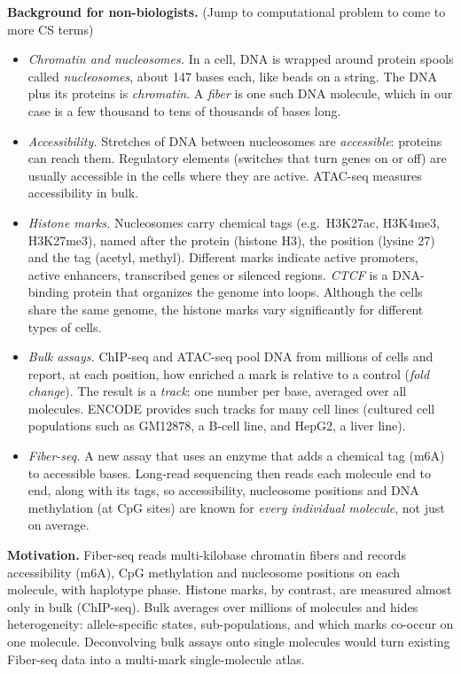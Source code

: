 \documentclass[acmtog]{acmart}
\begin{document}
\textbf{Background for non-biologists.} (Jump to computational problem to come to more CS terms)
\begin{itemize}
  \item \emph{Chromatin and nucleosomes.} In a cell, DNA is wrapped around protein spools called \emph{nucleosomes}, about 147 bases each, like beads on a string. The DNA plus its proteins is \emph{chromatin}. A \emph{fiber} is one such DNA molecule, which in our case is a few thousand to tens of thousands of bases long.
  \item \emph{Accessibility.} Stretches of DNA between nucleosomes are \emph{accessible}: proteins can reach them. Regulatory elements (switches that turn genes on or off) are usually accessible in the cells where they are active. ATAC-seq measures accessibility in bulk.
  \item \emph{Histone marks.} Nucleosomes carry chemical tags (e.g.\ H3K27ac, H3K4me3, H3K27me3), named after the protein (histone H3), the position (lysine 27) and the tag (acetyl, methyl). Different marks indicate active promoters, active enhancers, transcribed genes or silenced regions. \emph{CTCF} is a DNA-binding protein that organizes the genome into loops. Although the cells share the same genome, the histone marks vary significantly for different types of cells.
  \item \emph{Bulk assays.} ChIP-seq and ATAC-seq pool DNA from millions of cells and report, at each position, how enriched a mark is relative to a control (\emph{fold change}). The result is a \emph{track}: one number per base, averaged over all molecules. ENCODE provides such tracks for many cell lines (cultured cell populations such as GM12878, a B-cell line, and HepG2, a liver line).
  \item \emph{Fiber-seq.} A new assay that uses an enzyme that adds a chemical tag (m6A) to accessible bases. Long-read sequencing then reads each molecule end to end, along with its tags, so accessibility, nucleosome positions and DNA methylation (at CpG sites) are known for \emph{every individual molecule}, not just on average.
\end{itemize}

\textbf{Motivation.} Fiber-seq \citep{Stergachis20} reads multi-kilobase chromatin fibers and records accessibility (m6A), CpG methylation and nucleosome positions on each molecule, with haplotype phase. Histone marks, by contrast, are measured almost only in bulk (ChIP-seq). Bulk averages over millions of molecules and hides heterogeneity: allele-specific states, sub-populations, and which marks co-occur on one molecule. Deconvolving bulk assays onto single molecules would turn existing Fiber-seq data into a multi-mark single-molecule atlas.
\end{document}
